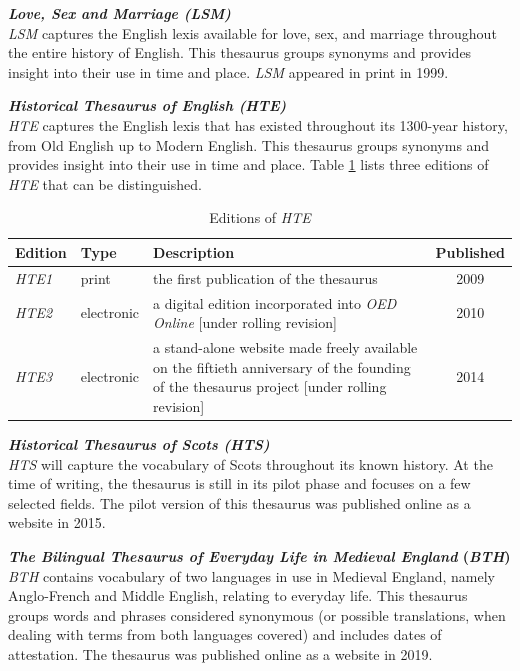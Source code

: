\bigskip
\noindent
\textbf{\textit{Love, Sex and Marriage (LSM)}}\\
\textit{LSM} captures the English lexis available for love, sex, and marriage throughout the entire history of English. This thesaurus groups synonyms and provides insight into their use in time and place. \textit{LSM} appeared in print in 1999.

\bigskip
\noindent
\textbf{\textit{Historical Thesaurus of English (HTE)}}\\
\textit{HTE} captures the English lexis that has existed throughout its 1300-year history, from Old English up to Modern English. This thesaurus groups synonyms and provides insight into their use in time and place. Table \ref{table:Stolk_thes-content:editions-HTE} lists three editions of \textit{HTE} that can be distinguished.

\begin{table}[h!]
    \centering
    \small
    \begin{tabular}{llp{2.8in}c}
    \toprule
        \textbf{Edition} & \textbf{Type} & \textbf{Description} & \textbf{Published} \\ 
    \midrule
    \textit{HTE1} & print & the first publication of the thesaurus & 2009 \\
    \textit{HTE2} & electronic & a digital edition incorporated into \textit{OED Online} [under rolling revision] & 2010 \\
    \textit{HTE3} & electronic & a stand-alone website made freely available on the fiftieth anniversary of the founding of the thesaurus project [under rolling revision] & 2014 \\
    \midrule
    \end{tabular}
    \caption[]{\label{table:Stolk_thes-content:editions-HTE}Editions of \textit{HTE}}
\end{table}


\bigskip
\noindent
\textbf{\textit{Historical Thesaurus of Scots (HTS)}}\\
\textit{HTS} will capture the vocabulary of Scots throughout its known history. At the time of writing, the thesaurus is still in its pilot phase and focuses on a few selected fields. The pilot version of this thesaurus was published online as a website in 2015.

\bigskip
\noindent
\textbf{\textit{The Bilingual Thesaurus of Everyday Life in Medieval England} (\textit{BTH})}\\
\textit{BTH} contains vocabulary of two languages in use in Medieval England, namely Anglo-French and Middle English, relating to everyday life. %
This thesaurus groups words and phrases considered synonymous (or possible translations, when dealing with terms from both languages covered) and includes dates of attestation. The thesaurus was published online as a website in 2019.


